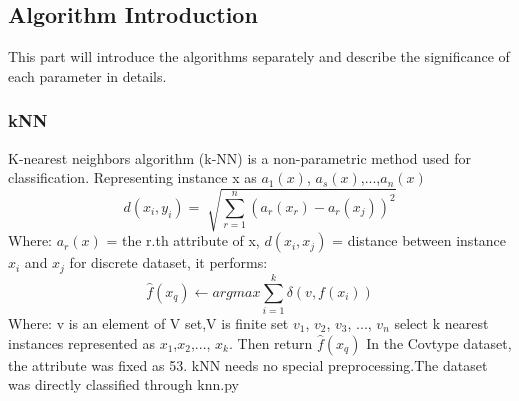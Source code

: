 \documentclass[12pt]{report}
\begin{document}
\subsection*{Algorithm Introduction}
This part will introduce the algorithms separately and describe the significance of each parameter in details.

\subsubsection*{kNN}
K-nearest neighbors algorithm (k-NN) is a non-parametric method used for classification. Representing instance x as $a_{1}(x)$, $a_{s}(x)$,...,$a_{n}(x)$
\newline$$d(x_{i}, y_{i}) = \sqrt[]{\sum_{r=1}^{n}(a_{r}(x_{r})-a_{r}(x_{j}))^2}$$
\newline Where: $a_{r}(x)$ = the r.th attribute of x, $d(x_i,x_j)$ = distance between instance $x_i$ and $x_j$
\newline for discrete dataset, it performs:
\newline $$\hat{f}(x_q)\leftarrow argmax\sum_{i=1}^k\delta(v,f(x_i))$$
\newline Where: v is an element of V set,V is finite set $v_1$, $v_2$, $v_3$, ..., $v_n$
\newline select k nearest instances represented as $x_1$,$x_2$,..., $x_k$. Then return $\hat{f}(x_q)$
\newline
In the Covtype dataset, the attribute was fixed as 53.
\newline kNN needs no special preprocessing.The dataset was directly classified through knn.py
\end{document}
